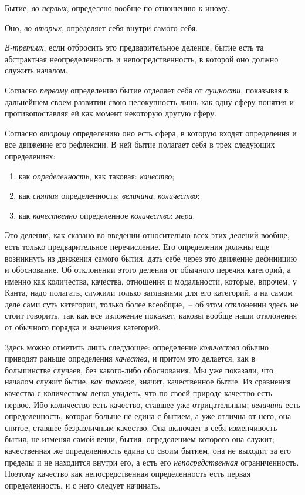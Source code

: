 Бытие, \emph{во-первых}, определено вообще по отношению
к иному.

Оно, \emph{во-вторых}, определяет себя внутри самого себя.

\emph{В-третьих}, если отбросить это предварительное деление,
бытие есть та абстрактная неопределенность и непосредственность,
в которой оно должно служить началом.


Согласно \emph{первому} определению бытие отделяет себя
от \emph{сущности}, показывая в дальнейшем своем развитии
свою целокупность лишь как одну сферу понятия и
противопоставляя ей как момент некоторую другую
сферу.

Согласно \emph{второму} определению оно есть сфера, в которую
входят определения и все движение его рефлексии.
В ней бытие полагает себя в трех следующих определениях:
\begin{enumerate}[label=\Roman*.]
\item как \emph{определенность}, как таковая: \emph{качество};
\item как \emph{снятая} определенность: \emph{величина}, \emph{количество};
\item как \emph{качественно} определенное \emph{количество}: \emph{мера}.
\end{enumerate}

Это деление, как сказано во введении относительно
всех этих делений вообще, есть только предварительное
перечисление. Его определения должны еще возникнуть
из движения самого бытия, дать себе через это движение
дефиницию и обоснование. Об отклонении этого деления
от обычного перечня категорий, а именно как количества,
качества, отношения и модальности, которые, впрочем,
у Канта, надо полагать, служили только заглавиями
для его категорий, а на самом деле сами суть категории,
только более всеобщие,~-- об этом отклонении здесь не стоит
говорить, так как все изложение покажет, каковы вообще
наши отклонения от обычного порядка и значения категорий.


Здесь можно отметить лишь следующее: определение
\emph{количества} обычно приводят раньше определения \emph{качества},
и притом это делается, как в большинстве случаев,
без какого-либо обоснования. Мы уже показали, что началом
служит бытие, \emph{как таковое}, значит, качественное
бытие. Из сравнения качества с количеством легко увидеть,
что по своей природе качество есть первое. Ибо
количество есть качество, ставшее уже отрицательным;
\emph{величина} есть определенность, которая больше не едина
с бытием, а уже отлична от него, она снятое, ставшее
безразличным качество. Она включает в себя изменчивость
бытия, не изменяя самой вещи, бытия, определением
которого она служит; качественная же определенность
едина со своим бытием, она не выходит за его
пределы и не находится внутри его, а есть его \emph{непосредственная}
ограниченность. Поэтому качество как непосредственная
определенность есть первая определенность,
и с него следует начинать.

